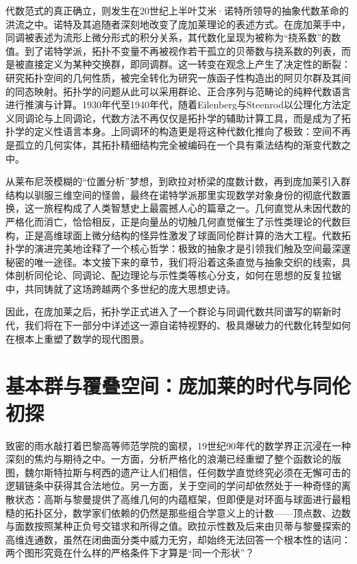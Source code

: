 \documentclass[12pt,a4paper]{article}
\begin{document}
代数范式的真正确立，则发生在20世纪上半叶艾米·诺特所领导的抽象代数革命的洪流之中。诺特及其追随者深刻地改变了庞加莱理论的表述方式。在庞加莱手中，同调被表述为流形上微分形式的积分关系，其代数化呈现为被称为“挠系数”的数值。到了诺特学派，拓扑不变量不再被视作若干孤立的贝蒂数与挠系数的列表，而是被直接定义为某种交换群，即同调群。这一转变在观念上产生了决定性的断裂：研究拓扑空间的几何性质，被完全转化为研究一族函子性构造出的阿贝尔群及其间的同态映射。拓扑学的问题从此可以采用群论、正合序列与范畴论的纯粹代数语言进行推演与计算。1930年代至1940年代，随着Eilenberg与Steenrod以公理化方法定义同调论与上同调论，代数方法不再仅仅是拓扑学的辅助计算工具，而是成为了拓扑学的定义性语言本身。上同调环的构造更是将这种代数化推向了极致：空间不再是孤立的几何实体，其拓扑精细结构完全被编码在一个具有乘法结构的渐变代数之中。

从莱布尼茨模糊的“位置分析”梦想，到欧拉对桥梁的度数计数，再到庞加莱引入群结构以驯服三维空间的怪兽，最终在诺特学派那里实现数学对象身份的彻底代数置换，这一旅程构成了人类智慧史上最震撼人心的篇章之一。几何直觉从未因代数的严格化而消亡，恰恰相反，正是向量丛的切触几何直觉催生了示性类理论的代数巨构，正是高维球面上微分结构的怪异性激发了球面同伦群计算的浩大工程。代数拓扑学的演进完美地诠释了一个核心哲学：极致的抽象才是引领我们触及空间最深邃秘密的唯一途径。本文接下来的章节，我们将沿着这条直觉与抽象交织的线索，具体剖析同伦论、同调论、配边理论与示性类等核心分支，如何在思想的反复拉锯中，共同铸就了这场跨越两个多世纪的庞大思想史诗。

因此，在庞加莱之后，拓扑学正式进入了一个群论与同调代数共同谱写的崭新时代，我们将在下一部分中详述这一源自诺特视野的、极具爆破力的代数化转型如何在根本上重塑了数学的现代图景。

\section{基本群与覆叠空间：庞加莱的时代与同伦初探}

致密的雨水敲打着巴黎高等师范学院的窗棂，19世纪90年代的数学界正沉浸在一种深刻的焦灼与期待之中。一方面，分析严格化的浪潮已经重塑了整个函数论的版图，魏尔斯特拉斯与柯西的遗产让人们相信，任何数学直觉终究必须在无懈可击的逻辑链条中获得其合法地位。另一方面，关于空间的学问却依然处于一种奇怪的离散状态：高斯与黎曼提供了高维几何的内蕴框架，但即便是对环面与球面进行最粗糙的拓扑区分，数学家们依赖的仍然是那些组合学意义上的计数——顶点数、边数与面数按照某种正负号交错求和所得之值。欧拉示性数及后来由贝蒂与黎曼探索的高维连通数，虽然在闭曲面分类中威力无穷，却始终无法回答一个根本性的诘问：两个图形究竟在什么样的严格条件下才算是“同一个形状”？
\end{document}
